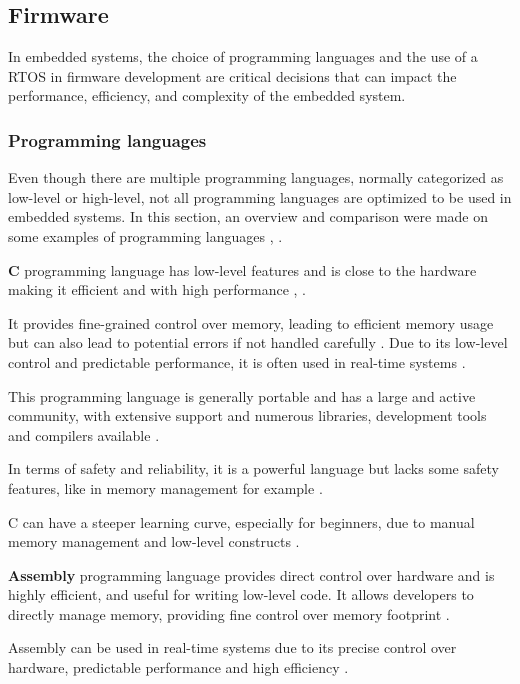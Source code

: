 
\subsection{Firmware}
In embedded systems, the choice of programming languages and the use of a \gls{RTOS} in firmware development are critical decisions that can impact the performance, efficiency, and complexity of the embedded system.

\subsubsection{Programming languages}
Even though there are multiple programming languages, normally categorized as low-level or high-level, not all programming languages are optimized to be used in embedded systems.
In this section, an overview and comparison were made on some examples of programming languages \cite{LPROG4}, \cite{LPROG6}.


\textbf{C} programming language has low-level features and is close to the hardware making it efficient and with high performance \cite{LPROG2}, \cite{LPROG6}.

It provides fine-grained control over memory, leading to efficient memory usage but can also lead to potential errors if not handled carefully \cite{LPROG5}.
Due to its low-level control and predictable performance, it is often used in real-time systems \cite{LPROG7}.

This programming language is generally portable and has a large and active community, with extensive support and numerous libraries, development tools and compilers available \cite{LPROG7}.

In terms of safety and reliability, it is a powerful language but lacks some safety features, like in memory management for example \cite{LPROG7}.

C can have a steeper learning curve, especially for beginners, due to manual memory management and low-level constructs \cite{LPROG2}.


\textbf{Assembly} programming language provides direct control over hardware and is highly efficient, and useful for writing low-level code.
It allows developers to directly manage memory, providing fine control over memory footprint \cite{LPROG7}.

Assembly can be used in real-time systems due to its precise control over hardware, predictable performance and high efficiency \cite{LPROG5}.

